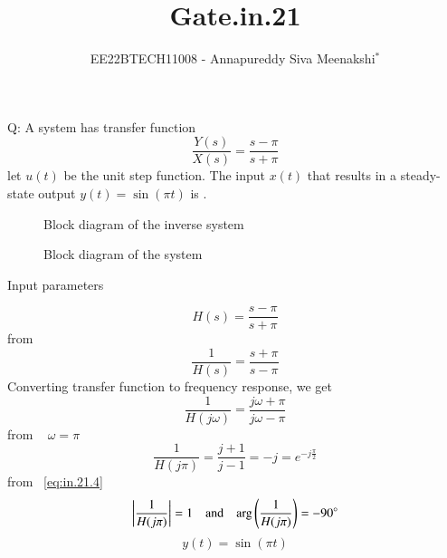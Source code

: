 \documentclass[journal,12pt,twocolumn]{IEEEtran}
\newcommand{\phase}[1]{\text{arg}\left(#1\right)}
\theoremstyle{remark}
\begin{document}

\vspace{3cm}

\title{Gate.in.21}
\author{EE22BTECH11008 - Annapureddy Siva Meenakshi$^{*}$}
\maketitle
\bigskip

\renewcommand{\thefigure}{\theenumi}
\renewcommand{\thetable}{\theenumi}
Q: A system has transfer function
\[\frac{Y(s)}{X(s)}=\frac {s-\pi}{s+\pi}\]
let $u(t)$ be the unit step function. The input $x(t)$ that results in a steady-state output $y(t)=\sin(\pi t)$ is \underline{\quad}.
\solution

\begin{figure}[htb]
  \centering
  
  \captionsetup{justification=centering, singlelinecheck=off}
  \caption{Block diagram of the inverse system}
  \label{fig:in_21_f1}
\end{figure}

\begin{figure}[htb]
  \centering
  
  \captionsetup{justification=centering, singlelinecheck=off}
  \caption{Block diagram of the system}
  \label{fig:in_21_f2}
\end{figure}

\begin{table}[!ht]
    \centering
        
    \caption{Input parameters}
    \label{tab:in_21_t1}
\end{table}

\begin{equation}
    H(s) = \frac{s - \pi}{s + \pi} 
\end{equation}
from ~
\begin{equation}
	\frac{1}{H(s)} = \frac{s + \pi}{s - \pi}
\end{equation}
Converting transfer function to frequency response, we get
\begin{equation}
    \frac{1}{H(j\omega)}=\frac{j\omega+\pi}{j\omega-\pi}
\end{equation}
from ~ $\omega=\pi$
\begin{equation}
   \frac{1}{H(j\pi)} = \frac{j + 1}{j - 1} = -j = e^{-j\frac{\pi}{2}}\label{eq:in.21.4} 
\end{equation}
from ~\eqref{eq:in.21.4} 
\begin{equation}
	\abs{\frac{1}{H(j\pi)}}=1 \quad \text{and} \quad \phase{\frac{1}{H(j\pi)}} = -90^\circ
\end{equation}
\begin{equation}
    y(t) = \sin(\pi t) \label{eq:in.21.6}
\end{equation}
\end{document}
